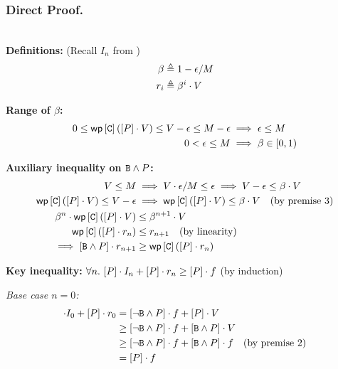 \subsubsection{Direct Proof.}~\\

\noindent\textbf{Definitions:} (Recall $I_n$ from )
\begin{align*}
  \beta &\triangleq 1 - \epsilon / M \\
  r_i &\triangleq \beta^i \cdot V
\end{align*}

\noindent\textbf{Range of $\beta$:}
\begin{align*}
  0 \leq \mathsf{wp}\left[{\mathtt{C}}\right]\left({[P] \cdot V}\right) \leq V - \epsilon \leq M - \epsilon
    &\implies \epsilon \leq M \\
  0 < \epsilon \leq M
    &\implies \beta \in [0, 1)
\end{align*}

\noindent\textbf{Auxiliary inequality on $\mathtt{B} \wedge P$:}
\begin{align*}
  V \leq M
    &\implies V \cdot \epsilon / M \leq \epsilon
    \implies V - \epsilon \leq \beta \cdot V \\
  \mathsf{wp}\left[{\mathtt{C}}\right]\left({[P] \cdot V}\right) \leq V - \epsilon
    &\implies \mathsf{wp}\left[{\mathtt{C}}\right]\left({[P] \cdot V}\right) \leq \beta \cdot V \quad \text{(by premise 3)} \\
  \beta^n \cdot \mathsf{wp}\left[{\mathtt{C}}\right]\left({[P] \cdot V}\right)
    &\leq \beta^{n+1} \cdot V \\
  \mathsf{wp}\left[{\mathtt{C}}\right]\left({[P] \cdot r_n}\right)
    &\leq r_{n+1} \quad \text{(by linearity)} \\
  \implies [\mathtt{B} \wedge P] \cdot r_{n+1}
    &\geq \mathsf{wp}\left[{\mathtt{C}}\right]\left({[P] \cdot r_n}\right)
\end{align*}

\noindent\textbf{Key inequality:} $\forall n.\ [P] \cdot I_n + [P] \cdot r_n \geq [P] \cdot f$ (by induction)

\noindent\textit{Base case $n = 0$:}
\begin{align*}
  [\pred] \cdot I_0 + [\pred] \cdot r_0
    &= [\neg\bexpr \wedge \pred] \cdot \ex + [\pred] \cdot V \\
    &\geq [\neg\bexpr \wedge \pred] \cdot \ex + [\bexpr \wedge \pred] \cdot V \\
    &\geq [\neg\bexpr \wedge \pred] \cdot \ex + [\bexpr \wedge \pred] \cdot \ex \quad \text{(by premise 2)} \\
    &= [\pred] \cdot \ex
\end{align*}

